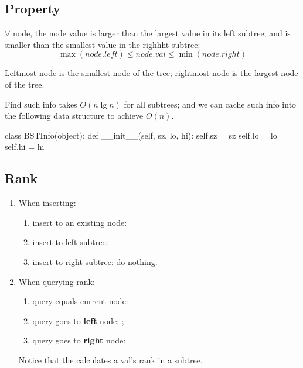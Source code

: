 \subsection{Property} $\forall$ node, the node value is larger than the largest value in its left subtree; and is smaller than the smallest value in the righhht subtree:
$$
\max(node.left) \leq node.val \leq \min(node.right)
$$

Leftmost node is the smallest node of the tree; rightmost node is the largest node of the tree.

Find such info takes $O(n\lg n)$ for all subtrees; and we can cache such info into the following data structure to achieve $O(n)$.

\begin{python}
class BSTInfo(object):
    def __init__(self, sz, lo, hi):
        self.sz = sz
        self.lo = lo
        self.hi = hi
\end{python}
\subsection{Rank}
\begin{enumerate}
\item When inserting: 
  \begin{enumerate}
  \item insert to an existing node: 
  \item insert to left subtree: 
  \item insert to right subtree: do nothing. 
\end{enumerate}
\item When querying rank:
  \begin{enumerate}
  \item query equals current node: 
  \item query goes to \textbf{left} node: ;
  \item query goes to \textbf{right} node:  
  \end{enumerate}
Notice that the  calculates a val's rank in a subtree.
\end{enumerate}

